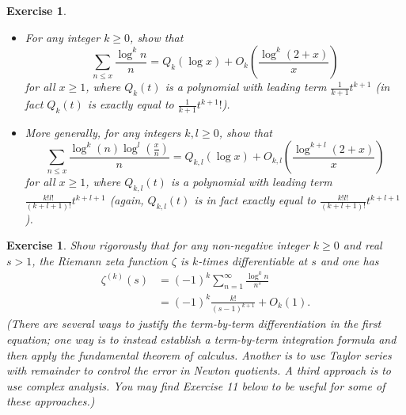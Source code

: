 \documentclass[10pt,reqno]{amsart}
\newtheorem{exercise}[theorem]{Exercise}
\begin{document}
\begin{exercise} \
    \begin{itemize}
        \item[(i)] For any integer $k \geq 0$, show that
        \begin{equation} \sum_{n \leq x} \frac{\log^k n}{n} = Q_k( \log x ) + O_k \left( \frac{\log^k (2+x)}{x} \right) \end{equation}
        for all $x \geq 1$, where $Q_k(t)$ is a polynomial with leading term $\frac{1}{k+1} t^{k+1}$ (in fact $Q_k(t)$ is exactly equal to $\frac{1}{k+1} t^{k+1}!$).

        \item[(ii)] More generally, for any integers $k,l \geq 0$, show that
        \begin{equation} \sum_{n \leq x} \frac{\log^k(n) \log^l \left( \frac{x}{n} \right)}{n} = Q_{k,l}( \log x ) + O_{k,l} \left( \frac{\log^{k+l} (2+x)}{x} \right) \end{equation}
        for all $x \geq 1$, where $Q_{k,l}(t)$ is a polynomial with leading term $\frac{k! l!}{(k+l+1)!} t^{k+l+1}$ (again, $Q_{k,l}(t)$ is in fact exactly equal to $\frac{k! l!}{(k+l+1)!} t^{k+l+1}$).
    \end{itemize}
\end{exercise}

\begin{exercise}
    Show rigorously that for any non-negative integer $k \geq 0$ and real $s>1$, the Riemann zeta function $\zeta$ is $k$-times differentiable at $s$ and one has
    \begin{equation}
    \begin{split}
        \zeta^{(k)}(s) &= (-1)^k \sum_{n=1}^\infty \frac{\log^k n}{n^s}\\
        &= (-1)^k \frac{k!}{(s-1)^{k+1}} + O_k(1).
    \end{split}
    \end{equation}
    (There are several ways to justify the term-by-term differentiation in the first equation; one way is to instead establish a term-by-term integration formula and then apply the fundamental theorem of calculus. Another is to use Taylor series with remainder to control the error in Newton quotients. A third approach is to use complex analysis. You may find Exercise 11 below to be useful for some of these approaches.)
\end{exercise}
\end{document}

